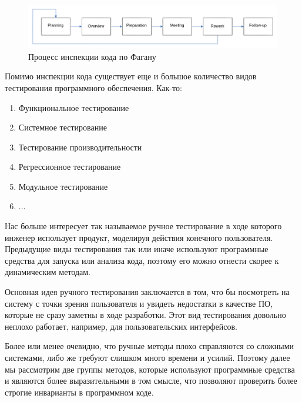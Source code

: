 \begin{figure}[H]
  \centering
  \includegraphics[width=\textwidth]{img/fagan.png}
  \caption{Процесс инспекции кода по Фагану}
\end{figure}

Помимо инспекции кода существует еще и большое количество видов тестирования программного обеспечения. Как-то:

\begin{enumerate}
  \item Функциональное тестирование
  \item Системное тестирование
  \item Тестирование производительности
  \item Регрессионное тестирование
  \item Модульное тестирование
  \item ...
\end{enumerate}

Нас больше интересует так называемое ручное тестирование в ходе которого инженер использует продукт, моделируя действия конечного пользователя. Предыдущие виды тестирования так или иначе используют программные средства для запуска или анализа кода, поэтому его можно отнести скорее к динамическим методам.

Основная идея ручного тестирования заключается в том, что бы посмотреть на систему с точки зрения пользователя и увидеть недостатки в качестве ПО, которые не сразу заметны в ходе разработки. Этот вид тестирования довольно неплохо работает, например, для пользовательских интерфейсов.

Более или менее очевидно, что ручные методы плохо справляются со сложными системами, либо же требуют слишком много времени и усилий. Поэтому далее мы рассмотрим две группы методов, которые используют программные средства и являются более выразительными в том смысле, что позволяют проверить более строгие инварианты в программном коде.
